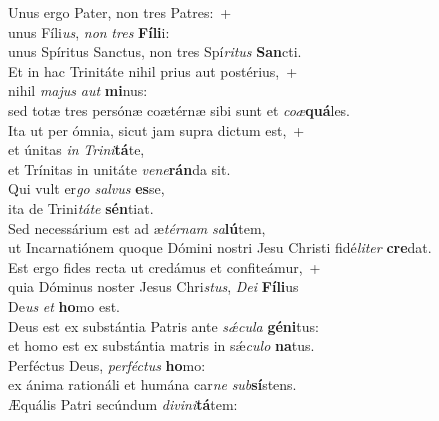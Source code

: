 \oddverse Unus ergo Pater, non tres Patres:~+\\
\oddverse  unus Fíli\textit{us}, \textit{non} \textit{tres} \textbf{Fí}\textbf{li}i:~\*\\
\oddverse unus Spíritus Sanctus, non tres Spí\textit{ri}\textit{tus} \textbf{San}cti.\\
\evenverse Et in hac Trinitáte nihil prius aut postérius,~+\\
\evenverse  nihil \textit{ma}\textit{jus} \textit{aut} \textbf{mi}nus:~\*\\
\evenverse sed totæ tres persónæ coætérnæ sibi sunt et \textit{co}\textit{æ}\textbf{quá}les.\\
\oddverse Ita ut per ómnia, sicut jam supra dictum est,~+\\
\oddverse  et únitas \textit{in} \textit{Tri}\textit{ni}\textbf{tá}te,~\*\\
\oddverse et Trínitas in unitáte \textit{ve}\textit{ne}\textbf{rán}da sit.\\
\evenverse Qui vult er\textit{go} \textit{sal}\textit{vus} \textbf{es}se,~\*\\
\evenverse ita de Trini\textit{tá}\textit{te} \textbf{sén}tiat.\\
\oddverse Sed necessárium est ad æ\textit{tér}\textit{nam} \textit{sa}\textbf{lú}tem,~\*\\
\oddverse ut Incarnatiónem quoque Dómini nostri Jesu Christi fidé\textit{li}\textit{ter} \textbf{cre}dat.\\
\evenverse Est ergo fides recta ut credámus et confiteámur,~+\\
\evenverse  quia Dóminus noster Jesus Chri\textit{stus}, \textit{De}\textit{i} \textbf{Fí}\textbf{li}us~\*\\
\evenverse De\textit{us} \textit{et} \textbf{ho}mo est.\\
\oddverse Deus est ex substántia Patris ante \textit{sǽ}\textit{cu}\textit{la} \textbf{gé}\textbf{ni}tus:~\*\\
\oddverse et homo est ex substántia matris in sǽ\textit{cu}\textit{lo} \textbf{na}tus.\\
\evenverse Perféctus Deus, \textit{per}\textit{fé}\textit{ctus} \textbf{ho}mo:~\*\\
\evenverse ex ánima rationáli et humána car\textit{ne} \textit{sub}\textbf{sí}stens.\\
\oddverse Æquális Patri secúndum \textit{di}\textit{vi}\textit{ni}\textbf{tá}tem:~\*\\
